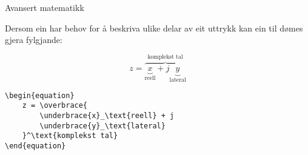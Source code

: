 \begin{frame}[containsverbatim]{Avansert matematikk}

  Dersom ein har behov for å beskriva ulike delar av eit uttrykk kan ein til dømes gjera fylgjande:
  
	\begin{equation}
		z = \overbrace{
			\underbrace{x}_\text{reell} + j
			\underbrace{y}_\text{lateral}
		}^\text{komplekst tal}
	\end{equation}
	
	\begin{verbatim}
\begin{equation}
	z = \overbrace{
		\underbrace{x}_\text{reell} + j
		\underbrace{y}_\text{lateral}
	}^\text{komplekst tal}
\end{equation}
	\end{verbatim}
	
\end{frame}
